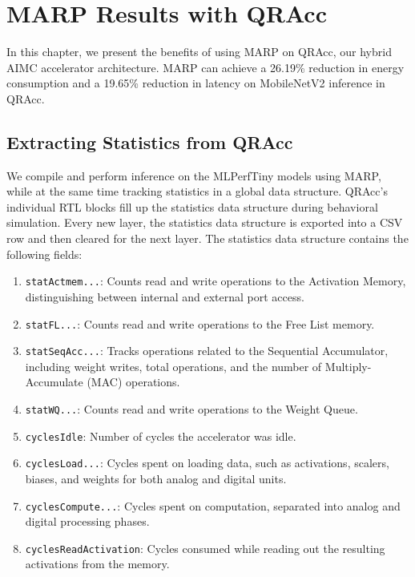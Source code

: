 \chapter{MARP Results with QRAcc}

In this chapter, we present the benefits of using MARP on QRAcc, our hybrid AIMC accelerator architecture. MARP can achieve a 26.19\% reduction in energy consumption and a 19.65\% reduction in latency on MobileNetV2 inference in QRAcc.  

\label{chap:marp_qracc}

\section{Extracting Statistics from QRAcc}

We compile and perform inference on the MLPerfTiny models using MARP, while at the same time tracking statistics in a global data structure. QRAcc's individual RTL blocks fill up the statistics data structure during behavioral simulation. Every new layer, the statistics data structure is exported into a CSV row and then cleared for the next layer. The statistics data structure contains the following fields:

\begin{enumerate}
    \item \texttt{statActmem...}: Counts read and write operations to the Activation Memory, distinguishing between internal and external port access.
    \item \texttt{statFL...}: Counts read and write operations to the Free List memory.
    \item \texttt{statSeqAcc...}: Tracks operations related to the Sequential Accumulator, including weight writes, total operations, and the number of Multiply-Accumulate (MAC) operations.
    \item \texttt{statWQ...}: Counts read and write operations to the Weight Queue.
    \item \texttt{cyclesIdle}: Number of cycles the accelerator was idle.
    \item \texttt{cyclesLoad...}: Cycles spent on loading data, such as activations, scalers, biases, and weights for both analog and digital units.
    \item \texttt{cyclesCompute...}: Cycles spent on computation, separated into analog and digital processing phases.
    \item \texttt{cyclesReadActivation}: Cycles consumed while reading out the resulting activations from the memory.
\end{enumerate}


